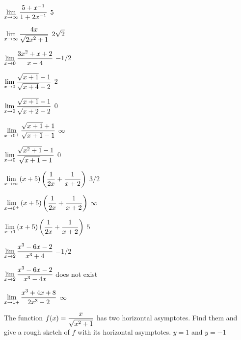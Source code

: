 \exercise $\displaystyle\lim_{x\to\infty}{5+x^{-1}\over 1+2x^{-1}}$
\answer $5$
\endanswer
\endexercise

\exercise $\displaystyle\lim_{x\to\infty}{4x\over\sqrt{2x^2+1}}$
\answer $\displaystyle 2\sqrt2$
\endanswer
\endexercise

\exercise $\displaystyle\lim_{x\to0}{3x^2+x+2\over x-4}$
\answer $-1/2$
\endanswer
\endexercise

\exercise $\displaystyle\lim_{x\to0}{\sqrt{x+1}-1\over \sqrt{x+4}-2}$
\answer $2$
\endanswer
\endexercise

\exercise $\displaystyle\lim_{x\to0}{\sqrt{x+1}-1\over \sqrt{x+2}-2}$
\answer $0$
\endanswer
\endexercise

\exercise $\displaystyle\lim_{x\to0^+}{\sqrt{x+1}+1\over\sqrt{x+1}-1}$
\answer $\infty$
\endanswer
\endexercise

\exercise $\displaystyle\lim_{x\to0}{\sqrt{x^2+1}-1\over\sqrt{x+1}-1}$
\answer $0$
\endanswer
\endexercise

\exercise $\displaystyle\lim_{x\to\infty}{(x+5)\left({1\over 2x}+{1\over x+2}\right)}$
\answer $3/2$
\endanswer
\endexercise

\exercise $\displaystyle\lim_{x\to0^+}{(x+5)\left({1\over 2x}+{1\over x+2}\right)}$
\answer $\infty$
\endanswer
\endexercise

\exercise $\displaystyle\lim_{x\to1}{(x+5)\left({1\over 2x}+{1\over x+2}\right)}$
\answer $5$
\endanswer
\endexercise

\exercise $\displaystyle\lim_{x\to2}{x^3-6x-2\over x^3+4}$
\answer $-1/2$
\endanswer
\endexercise

\exercise $\displaystyle\lim_{x\to2}{x^3-6x-2\over x^3-4x}$
\answer does not exist
\endanswer
\endexercise

\exercise $\displaystyle\lim_{x\to1+}{x^3+4x+8\over 2x^3-2}$
\answer $\infty$
\endanswer

\endtwocol

\msk
\endexercise

\exercise The function $\displaystyle f(x) = {x\over\sqrt{x^2+1}}$ has two horizontal
 asymptotes.  Find them and give a rough sketch of $f$ with its horizontal
 asymptotes. 
\answer $y=1$ and $y=-1$
\endanswer
\endexercise

\endexercises

